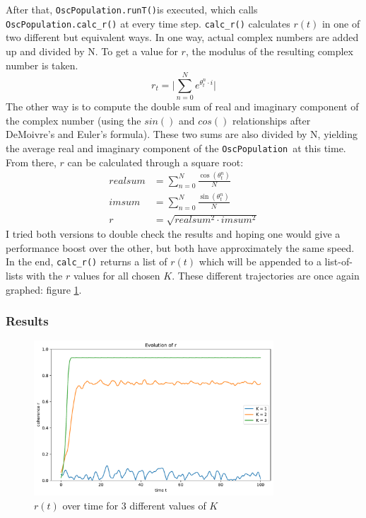 \documentclass[11pt,a4paper]{article}
\newcommand{\oscpop}{\texttt{OscPopulation}~}
\newcommand{\runT}{\mbox{\texttt{OscPopulation.runT()}}}
\newcommand{\code}[1]{\texttt{#1}}
\begin{document}
After that, \runT is executed, which calls \code{OscPopulation.calc\_r()} at every time step. 
\code{calc\_r()} calculates $r(t)$ in one of two different but equivalent ways. 
In one way, actual complex numbers are added up and divided by N. 
To get a value for $r$, the modulus of the resulting complex number is taken. 
$$ r_t = \lvert \sum_{n=0}^N e^{\theta^n_t \cdot i} \rvert$$
The other way is to compute the double sum of real and imaginary component of the complex number (using the $sin()$ and $cos()$ relationships after DeMoivre's and Euler's formula).
These two sums are also divided by N, yielding the average real and imaginary component of the \oscpop at this time. 
From there, $r$ can be calculated through a square root:
\begin{align*}
	realsum 	&= \sum_{n=0}^N \frac{\cos(\theta^n_t)}{N} \\
	imsum 		&= \sum_{n=0}^N \frac{\sin(\theta^n_t)}{N} \\
	r 			&= \sqrt{realsum^2 \cdot imsum^2}
\end{align*}
I tried both versions to double check the results and hoping one would give a performance boost over the other, but both have approximately the same speed.
In the end, \code{calc\_r()} returns a list of $r(t)$ which will be appended to a list-of-lists with the $r$ values for all chosen $K$. 
These different trajectories are once again graphed: figure \ref{2}.

\subsubsection{Results}

\begin{figure}[H]
	\centering
	\includegraphics[width=0.8\textwidth]{graphics/2_t-vs-r_omegaDistr=normal_N=1000_1611577412.pdf}
	\caption{$r(t)$ over time for 3 different values of $K$}
	\label{2}
\end{figure}
\end{document}
